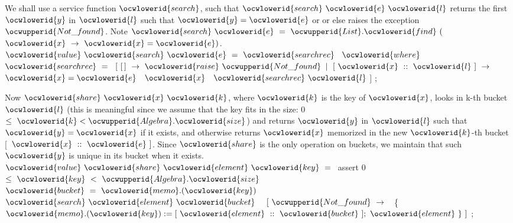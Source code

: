 \documentclass[12pt]{article}
\begin{document}
\ocwendcode{}\ocwindent{0.00em}
We shall use a service function \ocwbegindcode{}$\ocwlowerid{search}$\ocwenddcode{}, 
such that \ocwbegindcode{}$\ocwlowerid{search}~\ocwlowerid{e}~\ocwlowerid{l}$\ocwenddcode{} returns the first \ocwbegindcode{}$\ocwlowerid{y}$\ocwenddcode{}
in \ocwbegindcode{}$\ocwlowerid{l}$\ocwenddcode{} such that \ocwbegindcode{}$\ocwlowerid{y}=\ocwlowerid{e}$\ocwenddcode{} or or else raises the exception \ocwbegindcode{}$\ocwupperid{Not\_found}$\ocwenddcode{}.
\ocweol
\ocwindent{0.00em}
Note \ocwbegindcode{}$\ocwlowerid{search}~\ocwlowerid{e}~=~\ocwupperid{List}.\ocwlowerid{find}~($~$\ocwlowerid{x}~\rightarrow{}~\ocwlowerid{x}=\ocwlowerid{e})$\ocwenddcode{}. 
\ocweol
\label{../ML/share.ml:2209}%
\medskip
\ocwbegincode{}\ocwindent{0.00em}
$\ocwlowerid{value}~\ocwlowerid{search}~\ocwlowerid{e}~=~\ocwlowerid{searchrec}~$\ocweol
\ocwindent{1.00em}
$\ocwlowerid{where}~$~$\ocwlowerid{searchrec}~=~$\ocweol
\ocwindent{1.50em}
$[~[\,]~\rightarrow{}~\ocwlowerid{raise}~\ocwupperid{Not\_found}$\ocweol
\ocwindent{1.50em}
$\mid{}~[~\ocwlowerid{x}~::~\ocwlowerid{l}~]~\rightarrow{}~$~$\ocwlowerid{x}=\ocwlowerid{e}~$~$\ocwlowerid{x}~$~$\ocwlowerid{searchrec}~\ocwlowerid{l}$\ocweol
\ocwindent{1.50em}
$]$\ocweol
\ocwindent{0.00em}
;\medskip

\ocwendcode{}\ocwindent{0.00em}
Now \ocwbegindcode{}$\ocwlowerid{share}~\ocwlowerid{x}~\ocwlowerid{k}$\ocwenddcode{}, where \ocwbegindcode{}$\ocwlowerid{k}$\ocwenddcode{} is the key of \ocwbegindcode{}$\ocwlowerid{x}$\ocwenddcode{}, looks in k-th bucket \ocwbegindcode{}$\ocwlowerid{l}$\ocwenddcode{}
(this is meaningful since we assume that the key fits in the size: 
\ocwbegindcode{}0$\le{}~\ocwlowerid{k}<\ocwupperid{Algebra}.\ocwlowerid{size}$\ocwenddcode{}) and returns \ocwbegindcode{}$\ocwlowerid{y}$\ocwenddcode{} in \ocwbegindcode{}$\ocwlowerid{l}$\ocwenddcode{} such that \ocwbegindcode{}$\ocwlowerid{y}=\ocwlowerid{x}$\ocwenddcode{} if it exists, 
and otherwise returns \ocwbegindcode{}$\ocwlowerid{x}$\ocwenddcode{} memorized in the new \ocwbegindcode{}$\ocwlowerid{k}$\ocwenddcode{}-th bucket \ocwbegindcode{}[~$\ocwlowerid{x}~::~\ocwlowerid{e}~]$\ocwenddcode{}. 
Since \ocwbegindcode{}$\ocwlowerid{share}$\ocwenddcode{} is the only operation on buckets, 
we maintain that such \ocwbegindcode{}$\ocwlowerid{y}$\ocwenddcode{} is unique in its bucket when it exists. 
\ocweol
\label{../ML/share.ml:2763}%
\medskip
\ocwbegincode{}\ocwindent{0.00em}
$\ocwlowerid{value}~\ocwlowerid{share}~\ocwlowerid{element}~\ocwlowerid{key}~=~$\ocwbc{} assert \ocwbegindcode{}0~$\le{}~\ocwlowerid{key}~<~\ocwupperid{Algebra}.\ocwlowerid{size}$\ocwenddcode{} \ocwec{}\ocweol
\ocwindent{1.00em}
~$\ocwlowerid{bucket}~=~\ocwlowerid{memo}.(\ocwlowerid{key})~$\ocweol
\ocwindent{1.00em}
~$\ocwlowerid{search}~\ocwlowerid{element}~\ocwlowerid{bucket}~$~\ocweol
\ocwindent{2.00em}
$[~\ocwupperid{Not\_found}~\rightarrow{}~$~\{~$\ocwlowerid{memo}.(\ocwlowerid{key}):=[~\ocwlowerid{element}~::~\ocwlowerid{bucket}~];~\ocwlowerid{element}~\}~]$\ocweol
\ocwindent{0.00em}
;\medskip
\end{document}
